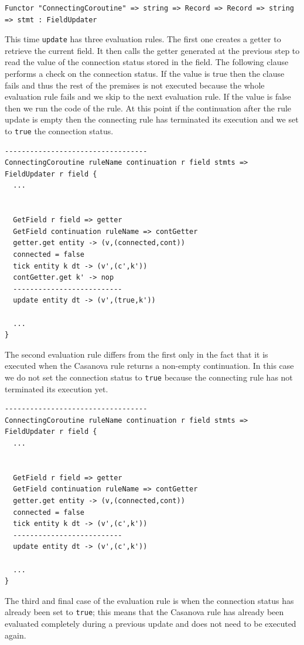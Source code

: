 \begin{lstlisting}
Functor "ConnectingCoroutine" => string => Record => Record => string => stmt : FieldUpdater
\end{lstlisting}

\noindent
This time \texttt{update} has three evaluation rules. The first one creates a getter to retrieve the current field. It then calls the getter generated at the previous step to read the value of the connection status stored in the field. The following clause performs a check on the connection status. If the value is true then the clause fails and thus the rest of the premises is not executed because the whole evaluation rule fails and we skip to the next evaluation rule. If the value is false then we run the code of the rule. At this point if the continuation after the rule update is empty then the connecting rule has terminated its execution and we set to \texttt{true} the connection status. 

\begin{lstlisting}
----------------------------------
ConnectingCoroutine ruleName continuation r field stmts => FieldUpdater r field {
  ...
  
  
  GetField r field => getter
  GetField continuation ruleName => contGetter
  getter.get entity -> (v,(connected,cont))
  connected = false
  tick entity k dt -> (v',(c',k'))
  contGetter.get k' -> nop
  --------------------------
  update entity dt -> (v',(true,k'))
  
  ...
}
\end{lstlisting}

\noindent
The second evaluation rule differs from the first only in the fact that it is executed when the Casanova rule returns a non-empty continuation. In this case we do not set the connection status to \texttt{true} because the connecting rule has not terminated its execution yet.

\begin{lstlisting}
----------------------------------
ConnectingCoroutine ruleName continuation r field stmts => FieldUpdater r field {
  ...
  
  
  GetField r field => getter
  GetField continuation ruleName => contGetter
  getter.get entity -> (v,(connected,cont))
  connected = false
  tick entity k dt -> (v',(c',k'))
  --------------------------
  update entity dt -> (v',(c',k'))
  
  ...
}
\end{lstlisting}

\noindent
The third and final case of the evaluation rule is when the connection status has already been set to \texttt{true}; this means that the Casanova rule has already been evaluated completely during a previous update and does not need to be executed again.\\

